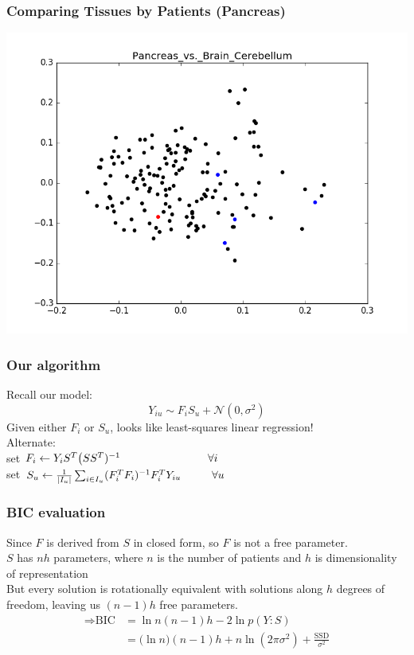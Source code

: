 \documentclass{beamer}
\newcommand{\hs}[1]{\hspace*{#1 cm}}
\newcommand{\tx}[1]{\text{#1}}
\begin{document}
\begin{frame} \frametitle{Comparing Tissues by Patients (Pancreas)}
\includegraphics[scale=0.56]{Cerebellum_x_Pancreas.png}
\end{frame}


\begin{frame} \frametitle{Our algorithm}
Recall our model:
\[ Y_{iu} \sim F_i S_u + \mathcal{N}(0, \sigma^2) \]
Given either $F_i$ or $S_u$, looks like least-squares linear regression! \\

Alternate: \\
\hs{1} set $F_i \leftarrow Y_i S^T\big(SS^T)^{-1} \hs{2.8}\forall i$ \\
\hs{1} set $S_u \leftarrow \frac{1}{|I_u|}\sum_{i \in I_u} (F_i^TF_i)^{-1}F_i^T Y_{iu} \hs{1}\forall u$
\end{frame}


\begin{frame} \frametitle{BIC evaluation}
Since $F$ is derived from $S$ in closed form, so $F$ is not a free parameter. \\
$S$ has $nh$ parameters, where $n$ is the number of patients and $h$ is dimensionality of representation \\
But every solution is rotationally equivalent with solutions along $h$ degrees of freedom, leaving us $(n-1)h$ free parameters. \\
\begin{align*}
\Rightarrow \tx{BIC} &= \ln n(n-1)h -2\ln p(Y : S)
\\&= \big(\ln n\big) (n-1)h + n \ln (2\pi\sigma^2) + \frac{\tx{SSD}}{\sigma^2}
\end{align*}
\end{frame}
\end{document}
